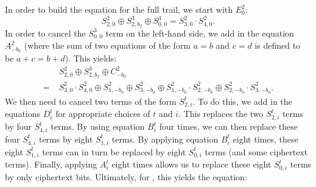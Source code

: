 \documentclass{llncs}
\begin{document}
In order to build the equation for the full trail, we start with $E^2_0$:
\[
S^2_{2,0} \oplus S^{3}_{2,b_2} \oplus S^{3}_{0,0} = S^2_{3,0} \cdot S^2_{4,0}.
\]
In order to cancel the $S^{3}_{0,0}$ term on the left-hand side, we add in the equation $A^2_{-b_0}$ (where the sum of two equations of the form $a = b$ and $c = d$ is defined to be $a+c = b+d$). This yields:
\begin{align*}
&S^2_{2,0} \oplus S^3_{2,b_2} \oplus C^2_{-b_0}\\
=\; &S^2_{3,0} \cdot S^2_{4,0} \oplus S^2_{1,-b_0} \oplus S^2_{3,-b_0} \oplus S^2_{1,-b_0} \cdot S^2_{2,-b_0} \oplus S^2_{2,-b_0} \cdot S^2_{3,-b_0}.
\end{align*}
We then need to cancel two terms of the form $S^t_{2,i}$. To do this, we add in the equations $D^t_i$ for appropriate choices of $t$ and $i$. This replaces the two $S^t_{2,i}$ terms by four $S^t_{4,i}$ terms. By using equation $B^t_i$ four times, we can then replace these four $S^t_{4,i}$ terms by eight $S^t_{1,i}$ terms. By applying equation $B^t_i$ eight times, these eight $S^t_{1,i}$ terms can in turn be replaced by eight $S^t_{0,i}$ terms (and some ciphertext terms). Finally, applying $A^t_i$ eight times allows us to replace these eight $S^t_{0,i}$ terms by only ciphertext bits. Ultimately, for , this yields the equation:
\end{document}
